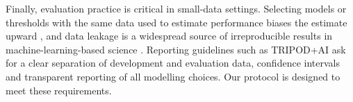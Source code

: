 Finally, evaluation practice is critical in small-data settings. Selecting models or thresholds with the same data
used to estimate performance biases the estimate upward \citep{varma2006bias}, and data leakage is a widespread
source of irreproducible results in machine-learning-based science \citep{kapoor2023leakage}. Reporting guidelines
such as TRIPOD+AI \citep{collins2024tripod} ask for a clear separation of development and evaluation data,
confidence intervals and transparent reporting of all modelling choices. Our protocol is designed to meet these
requirements.
